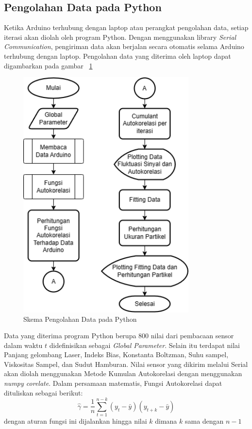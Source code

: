 \subsection{Pengolahan Data pada Python}
Ketika Arduino terhubung dengan laptop atau perangkat pengolahan data, setiap iterasi akan diolah
oleh program Python. Dengan menggunakan library \textit{Serial Communication}, pengiriman data
akan berjalan secara otomatis selama Arduino terhubung dengan laptop. Pengolahan data yang
diterima oleh laptop dapat digambarkan pada gambar ~\ref{fig:schemapy}

\begin{figure}[H]
    \centering
    \includegraphics[width=9cm]{Images/Skema Python.png}
    \caption{Skema Pengolahan Data pada Python}
    \label{fig:schemapy}
\end{figure}

Data yang diterima program Python berupa 800 nilai dari pembacaan sensor dalam waktu ${t}$
didefinisikan sebagai \textit{Global Parameter}. Selain itu terdapat nilai Panjang gelombang
Laser, Indeks Bias, Konstanta Boltzman, Suhu sampel, Viskositas Sampel, dan Sudut Hamburan.
Nilai sensor yang dikirim melalui Serial akan diolah menggunakan Metode Kumulan Autokorelasi
dengan menggunakan \textit{numpy corelate}. Dalam persamaan matematis, Fungsi Autokorelasi
dapat dituliskan sebagai berikut:
\begin{equation}
    \hat{\gamma} = \frac{1}{n} \sum_{t=1}^{n-k}\left(y_t - \bar{y}\right)\left(y_{t+k} - \bar{y}\right)
\end{equation}
\noindent
dengan aturan fungsi ini dijalankan hingga nilai ${k}$ dimana ${k}$ sama dengan ${n-1}$

